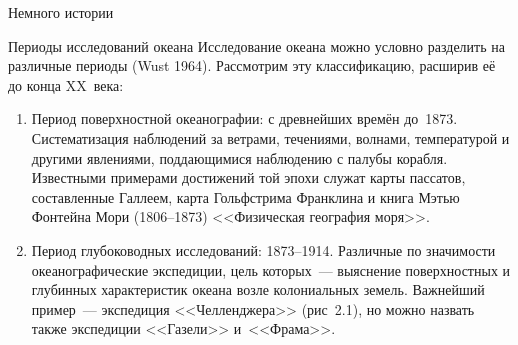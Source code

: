 \begin{chapter}{Немного истории}
\begin{section}{Периоды исследований океана}
Исследование океана можно условно разделить на различные периоды 
(Wust 1964). Рассмотрим эту классификацию, расширив её до конца XX~века:
%
\begin{enumerate}
\item  
Период поверхностной океанографии: с древнейших времён до~1873. 
Систематизация наблюдений за ветрами,
течениями, волнами, температурой и другими явлениями, поддающимися
наблюдению с палубы корабля. Известными примерами достижений той эпохи 
служат карты пассатов, составленные Галлеем, карта Гольфстрима Франклина 
и книга Мэтью Фонтейна Мори (1806--1873) <<Физическая география моря>>.
%

\item
Период глубоководных исследований: 1873--1914.
Различные по значимости океанографические экспедиции, цель 
которых~--- выяснение поверхностных и глубинных характеристик океана возле
колониальных земель. Важнейший пример~--- экспедиция
<<Челленджера>> (рис~2.1), но можно назвать также экспедиции <<Газели>> 
и~<<Фрама>>.
%



\end{enumerate}
\end{section}
\end{chapter}
